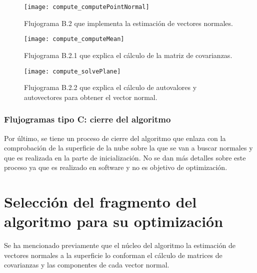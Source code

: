 

\begin{figure}[h!]
\centering
\texttt{[image: compute\_computePointNormal]}
\caption{Flujograma B.2 que implementa la estimación de vectores normales.}\label{fig:compute_computePointNormal}
\end{figure}


\begin{figure}[h!]
\centering
\texttt{[image: compute\_computeMean]}
\caption{Flujograma B.2.1 que explica el cálculo de la matriz de covarianzas.}\label{fig:compute_computeMean}
\end{figure}


\begin{figure}[h!]
\centering
\texttt{[image: compute\_solvePlane]}
\caption{Flujograma B.2.2 que explica el cálculo de autovalores y autovectores para obtener el vector normal.}\label{fig:compute_solvePlane}
\end{figure}



\subsubsection{Flujogramas tipo C: cierre del algoritmo}
Por último, se tiene un proceso de cierre del algoritmo que enlaza con la comprobación de la superficie de la nube sobre la que se van a buscar normales y que es realizada en la parte de inicialización. No se dan más detalles sobre este proceso ya que es realizado en software y no es objetivo de optimización.



\section{Selección del fragmento del algoritmo para su optimización}
Se ha mencionado previamente que el núcleo del algoritmo la estimación de vectores normales a la superficie lo conforman el cálculo de matrices de covarianzas y las componentes de cada vector normal.

